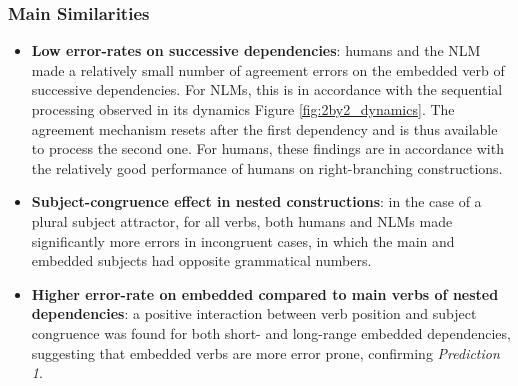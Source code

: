\subsubsection{Main Similarities}
\begin{itemize}
    \item \textbf{Low error-rates on successive dependencies}: humans and the NLM made a relatively small number of agreement errors on the embedded verb of successive dependencies. For NLMs, this is in accordance with the sequential processing observed in its dynamics Figure \ref{fig:2by2_dynamics}. The agreement mechanism resets after the first dependency and is thus available to process the second one. For humans, these findings are in accordance with the relatively good performance of humans on right-branching constructions.
    \item \textbf{Subject-congruence effect in nested constructions}: in the case of a plural subject attractor, for all verbs, both humans and NLMs made significantly more errors in incongruent cases, in which the main and embedded subjects had opposite grammatical numbers.
    \item \textbf{Higher error-rate on embedded compared to main verbs of nested dependencies}: a positive interaction between verb position and subject congruence was found for both short- and long-range embedded dependencies, suggesting that embedded verbs are more error prone, confirming \textit{Prediction 1}.

    
\end{itemize}

